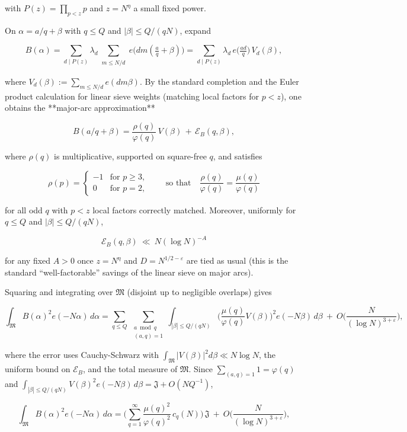 \documentclass[11pt]{article}
\theoremstyle{definition}
\theoremstyle{remark}
\begin{document}
with $P(z)=\prod_{p<z}p$ and $z=N^{\eta}$ a small fixed power.

On $\alpha=a/q+\beta$ with $q\le Q$ and $|\beta|\le Q/(qN)$, expand

$$
	B(\alpha)=\sum_{d\mid P(z)}\lambda_d
	\sum_{\substack{m\le N/d}} e\!\big(dm(\tfrac aq+\beta)\big)
	=\sum_{d\mid P(z)}\lambda_d\, e\!\big(\tfrac{ad}{q}\big)\,V_d(\beta),
$$

where $V_d(\beta):=\sum_{m\le N/d}e(dm\beta)$. By the standard completion and the Euler product calculation for linear sieve weights (matching local factors for $p<z$), one obtains the **major-arc approximation**

$$
	B(a/q+\beta)=\frac{\rho(q)}{\varphi(q)}\,V(\beta)\,+\,\mathcal E_B(q,\beta),
$$

where $\rho(q)$ is multiplicative, supported on square-free $q$, and satisfies

$$
	\rho(p)=
	\begin{cases}
		-1 & \text{for } p\ge 3, \\
		0  & \text{for } p=2,
	\end{cases}
	\qquad\text{so that}\quad \frac{\rho(q)}{\varphi(q)}=\frac{\mu(q)}{\varphi(q)}
$$

for all odd $q$ with $p<z$ local factors correctly matched. Moreover, uniformly for $q\le Q$ and $|\beta|\le Q/(qN)$,

$$
	\mathcal E_B(q,\beta)\ \ll\ N(\log N)^{-A}
$$

for any fixed $A>0$ once $z=N^\eta$ and $D=N^{1/2-\varepsilon}$ are tied as usual (this is the standard “well-factorable” savings of the linear sieve on major arcs).

Squaring and integrating over $\mathfrak M$ (disjoint up to negligible overlaps) gives

$$
	\int_{\mathfrak M} B(\alpha)^2 e(-N\alpha)\,d\alpha
	= \sum_{q\le Q}\ \sum_{\substack{a\bmod q\\(a,q)=1}}
	\int_{|\beta|\le Q/(qN)}
	\Big(\frac{\mu(q)}{\varphi(q)}V(\beta)\Big)^{\!2} e(-N\beta)\,d\beta
	\ +\ O\!\Big(\frac{N}{(\log N)^{3+\varepsilon}}\Big),
$$

where the error uses Cauchy-Schwarz with $\int_{\mathfrak M}|V(\beta)|^2 d\beta\ll N\log N$, the uniform bound on $\mathcal E_B$, and the total measure of $\mathfrak M$.
Since $\sum_{(a,q)=1}1=\varphi(q)$ and $\int_{|\beta|\le Q/(qN)}V(\beta)^2 e(-N\beta)\,d\beta=\mathfrak J+O(NQ^{-1})$,

$$
	\int_{\mathfrak M} B(\alpha)^2 e(-N\alpha)\,d\alpha
	= \Big(\sum_{q=1}^{\infty}\frac{\mu(q)^2}{\varphi(q)^2}\,c_q(N)\Big)\,\mathfrak J
	\ +\ O\!\Big(\frac{N}{(\log N)^{3+\varepsilon}}\Big),
$$
\end{document}
